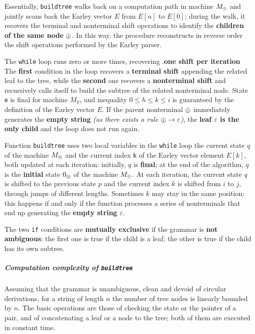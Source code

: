 \documentclass[english]{article}
\begin{document}
Essentially, \texttt{buildtree} walks back on a computation path in machine \(M_\oplus\) and jointly scans back the Earley vector \(E\) from \(E[n]\) to \(E[0]\);
during the walk, it recovers the terminal and nonterminal shift operations to identify the \textbf{children of the same node} \(\oplus\).
In this way, the procedure reconstructs in reverse order the shift operations performed by the Earley parser.

The \texttt{while} loop runs zero or more times, recovering .\textbf{one shift per iteration}
The \textbf{first} condition in the loop recovers a \textbf{terminal shift} appending the related leaf to the tree, while the \textbf{second} one recovers a \textbf{nonterminal shift} and recursively calls itself to build the subtree of the related nonterminal node.
State \texttt{e} is final for machine \(M_Y\), and inequality \(0 \leq h \leq k \leq i\) is guaranteed by the definition of the Earley vector \(E\).
If the parent nonterminal \(\oplus\) immediately generates the \textbf{empty string} \textit{(as there exists a rule \(\oplus \rightarrow \varepsilon\))}, the \textbf{leaf \(\varepsilon\) is the only child} and the loop does not run again.

Function \texttt{buildtree} uses two local variables in the \texttt{while} loop the current state \(q\) of the machine \(M_\oplus\) and the current index \texttt{k} of the Earley vector element \(E[k]\), both updated at each iteration:
initially, \(q\) is \textbf{final}; at the end of the algorithm, \(q\) is the \textbf{initial} state \(0_\oplus\) of the machine \(M_\oplus\).
At each iteration, the current state \(q\) is shifted to the previous state \(p\) and the current index \(k\) is shifted from \(i\) to \(j\), through jumps of different lengths.
Sometimes \(k\) may stay in the same position: this happens if and only if the function processes a series of nonterminals that end up generating the \textbf{empty string \(\varepsilon\)}.

The two \texttt{if} conditions are \textbf{mutually exclusive} if the grammar is \textbf{not ambiguous}:
the first one is true if the child is a leaf; the other is true if the child has its own subtree.

\subparagraph*{Computation complexity of \texttt{buildtree}}

Assuming that the grammar is unambiguous, clean and devoid of circular derivations, for a string of length \(n\) the number of tree nodes is linearly bounded by \(n\).
The basic operations are those of checking the state or the pointer of a pair, and of concatenating a leaf or a node to the tree; both of them are executed in constant time.
\end{document}
